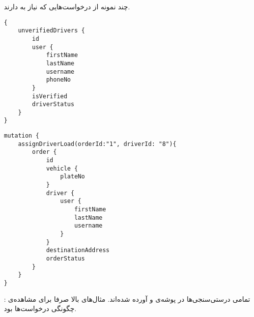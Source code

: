 	
	

	
		 چند نمونه از درخواست‌هایی که نیاز به  دارند.
		
			 
	\begin{latin}
		\begin{verbatim}
{
	unverifiedDrivers {
		id
		user {
			firstName
			lastName
			username
			phoneNo
		}
		isVerified
		driverStatus
	}
}
		\end{verbatim}
	\end{latin}

			 
	\begin{latin}
		\begin{verbatim}
mutation {
	assignDriverLoad(orderId:"1", driverId: "8"){
		order {
			id
			vehicle {
				plateNo
			}  
			driver {
				user {
					firstName
					lastName
					username
				}
			}
			destinationAddress
			orderStatus
		}
	}
}
		\end{verbatim}
	\end{latin}

: تمامی درستی‌سنجی‌ها در پوشه‌ی  و  آورده شده‌اند. مثال‌های بالا صرفا برای مشاهده‌ی چگونگی درخواست‌ها بود.